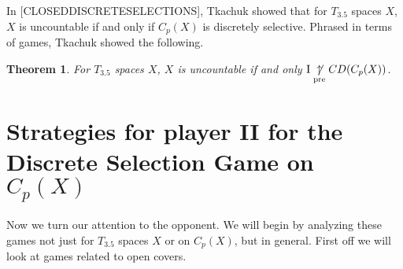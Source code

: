 \documentclass{amsart}
\theoremstyle{plain}
\newtheorem{theorem}{Theorem}
\theoremstyle{definition}
\theoremstyle{remark}
\theoremstyle{plain}
\theoremstyle{definition}
\theoremstyle{remark}
\begin{document}
In [CLOSEDDISCRETESELECTIONS], Tkachuk showed that for \(T_{3.5}\) spaces \(X\), \(X\) is uncountable if and only if \(C_p(X)\) is discretely selective.
Phrased in terms of games, Tkachuk showed the following.
\begin{theorem}
  For \(T_{3.5}\) spaces \(X\), \(X\) is uncountable if and only \(\mathrm{I}\underset{\text{pre}}{\not\uparrow} CD(C_p(X))\).
\end{theorem}

\section{Strategies for player II for the Discrete Selection Game on \(C_p(X)\)}

\renewcommand{\rothGame}[1]{\ensuremath{G_1(\mc O_{#1},\mc O_{#1})}}

Now we turn our attention to the opponent.
We will begin by analyzing these games not just for \(T_{3.5}\) spaces \(X\) or on \(C_p(X)\), but in general.
First off we will look at games related to open covers.
\end{document}
